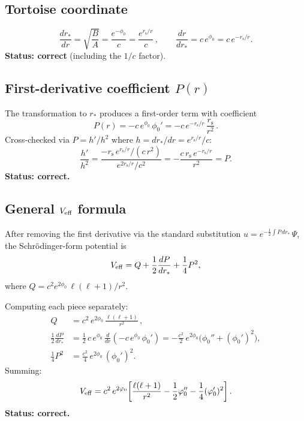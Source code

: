 \documentclass[11pt]{article}
\newcommand{\rs}{r_{\mathrm{s}}}
\begin{document}
\subsection{Tortoise coordinate}
\begin{equation}
\frac{dr_*}{dr}=\sqrt{\frac{B}{A}}
=\frac{e^{-\phi_0}}{c}=\frac{e^{\rs/r}}{c}\,,
\qquad
\frac{dr}{dr_*}=c\,e^{\phi_0}=c\,e^{-\rs/r}.
\end{equation}
\textbf{Status: \checkmark\; correct} (including the $1/c$ factor).

\subsection{First-derivative coefficient $P(r)$}
The transformation to $r_*$ produces a first-order term with coefficient
\begin{equation}
P(r)=-c\,e^{\phi_0}\,\phi_0'=-c\,e^{-\rs/r}\,\frac{\rs}{r^2}\,.
\end{equation}
Cross-checked via $P=h'/h^2$ where $h=dr_*/dr=e^{\rs/r}/c$:
\begin{equation}
\frac{h'}{h^2}=\frac{-\rs\,e^{\rs/r}/(c\,r^2)}{e^{2\rs/r}/c^2}
=-\frac{c\,\rs\,e^{-\rs/r}}{r^2}=P.
\end{equation}
\textbf{Status: \checkmark\; correct.}

\subsection{General $V_{\rm eff}$ formula}
After removing the first derivative via the standard substitution
$u=e^{-\frac{1}{2}\int P\,dr_*}\,\Psi$, the Schr\"odinger-form
potential is
\begin{equation}
V_{\rm eff}=Q+\frac{1}{2}\frac{dP}{dr_*}+\frac{1}{4}P^2,
\label{eq:Veff_gen}
\end{equation}
where $Q=c^2 e^{2\phi_0}\,\ell(\ell+1)/r^2$.

Computing each piece separately:
\begin{align}
Q &= c^2\,e^{2\phi_0}\,\frac{\ell(\ell+1)}{r^2}\,,\\[2mm]
\frac{1}{2}\frac{dP}{dr_*}
&=\frac{1}{2}\,c\,e^{\phi_0}\,\frac{d}{dr}\!\left(-c\,e^{\phi_0}\,\phi_0'\right)
=-\frac{c^2}{2}\,e^{2\phi_0}\bigl(\phi_0''+(\phi_0')^2\bigr),\\[2mm]
\frac{1}{4}P^2
&=\frac{c^2}{4}\,e^{2\phi_0}\,(\phi_0')^2.
\end{align}
Summing:
\begin{equation}
V_{\rm eff}=c^2\,e^{2\phi_0}\!\left[
\frac{\ell(\ell+1)}{r^2}
-\frac{1}{2}\phi_0''
-\frac{1}{4}(\phi_0')^2
\right].
\end{equation}
\textbf{Status: \checkmark\; correct.}
\end{document}
